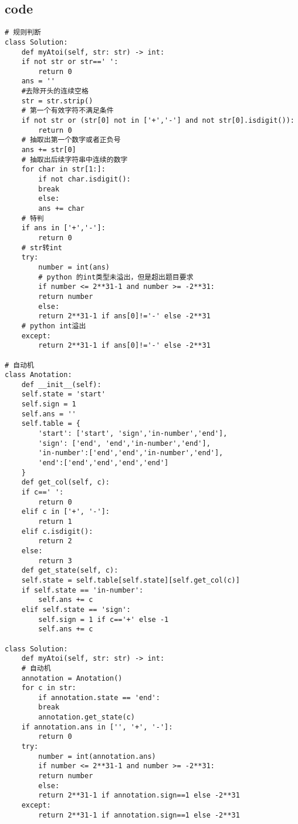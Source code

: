 \documentclass[11pt]{article}
\begin{document}
\subsection{code}
\label{sec:org7711ced}
\begin{verbatim}
# 规则判断
class Solution:
    def myAtoi(self, str: str) -> int:
	if not str or str==' ':
	    return 0
	ans = ''
	#去除开头的连续空格
	str = str.strip()
	# 第一个有效字符不满足条件
	if not str or (str[0] not in ['+','-'] and not str[0].isdigit()):
	    return 0
	# 抽取出第一个数字或者正负号
	ans += str[0]
	# 抽取出后续字符串中连续的数字
	for char in str[1:]:
	    if not char.isdigit():
		break
	    else:
		ans += char
	# 特判
	if ans in ['+','-']:
	    return 0
	# str转int
	try:
	    number = int(ans)
	    # python 的int类型未溢出，但是超出题目要求
	    if number <= 2**31-1 and number >= -2**31:
		return number
	    else:
		return 2**31-1 if ans[0]!='-' else -2**31
	# python int溢出
	except:
	    return 2**31-1 if ans[0]!='-' else -2**31

# 自动机
class Anotation:
    def __init__(self):
	self.state = 'start'
	self.sign = 1
	self.ans = ''
	self.table = {
	    'start': ['start', 'sign','in-number','end'],
	    'sign': ['end', 'end','in-number','end'],
	    'in-number':['end','end','in-number','end'],
	    'end':['end','end','end','end']
	}
    def get_col(self, c):
	if c==' ':
	    return 0
	elif c in ['+', '-']:
	    return 1
	elif c.isdigit():
	    return 2
	else:
	    return 3
    def get_state(self, c):
	self.state = self.table[self.state][self.get_col(c)]
	if self.state == 'in-number':
	    self.ans += c
	elif self.state == 'sign':
	    self.sign = 1 if c=='+' else -1
	    self.ans += c

class Solution:
    def myAtoi(self, str: str) -> int:
	# 自动机
	annotation = Anotation()
	for c in str:
	    if annotation.state == 'end':
		break
	    annotation.get_state(c)
	if annotation.ans in ['', '+', '-']:
	    return 0
	try:
	    number = int(annotation.ans)
	    if number <= 2**31-1 and number >= -2**31:
		return number
	    else:
		return 2**31-1 if annotation.sign==1 else -2**31
	except:
	    return 2**31-1 if annotation.sign==1 else -2**31
\end{verbatim}
\end{document}
